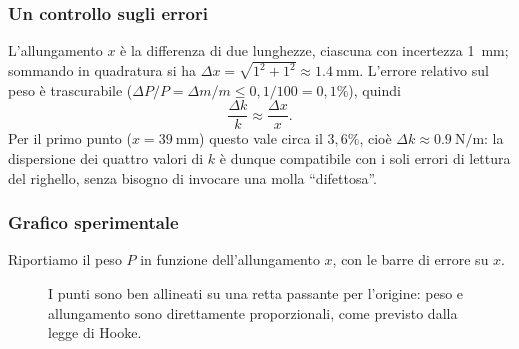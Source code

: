 \subsubsection{Un controllo sugli errori}
L'allungamento $x$ è la differenza di due lunghezze, ciascuna con incertezza \SI{1}{\milli\metre}; sommando in quadratura si ha $\Delta x=\sqrt{1^2+1^2}\approx\SI{1,4}{\milli\metre}$. L'errore relativo sul peso è trascurabile ($\Delta P/P=\Delta m/m\le 0{,}1/100=0{,}1\%$), quindi
\[ \frac{\Delta k}{k}\approx\frac{\Delta x}{x}. \]
Per il primo punto ($x=\SI{39}{\milli\metre}$) questo vale circa il $3{,}6\%$, cioè $\Delta k\approx\SI{0,9}{\newton\per\metre}$: la dispersione dei quattro valori di $k$ è dunque compatibile con i soli errori di lettura del righello, senza bisogno di invocare una molla ``difettosa''.

\subsubsection{Grafico sperimentale}
Riportiamo il peso $P$ in funzione dell'allungamento $x$, con le barre di errore su $x$.

\begin{figure}[!htbp]
    \centering
    \caption{I punti sono ben allineati su una retta passante per l'origine: peso e allungamento sono direttamente proporzionali, come previsto dalla legge di Hooke.}
    \label{fig:grafico-hooke}
\end{figure}


